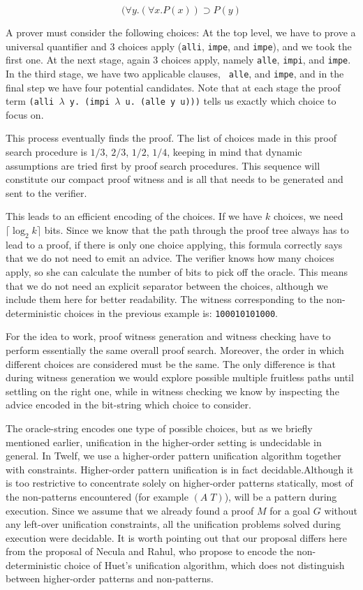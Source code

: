 \documentclass{acmconf}
\newcommand{\impl}{\supset}
\begin{document}
\[
(\forall y. (\forall x.P(x)) \impl P(y)
\]

A prover must consider the following choices: At the top level, we
have to prove a universal quantifier and 3 choices apply ({\tt alli},
{\tt impe}, and {\tt impe}), and we took the first one. At the next
stage, again 3 choices apply, namely {\tt alle}, {\tt   impi}, and
{\tt impe}. In the third stage, we have two applicable clauses, {\tt
  alle}, and {\tt impe}, and in the final step we have four potential
candidates. Note that at each stage the proof term {\tt (alli
  $\lambda$ y. (impi $\lambda$ u. (alle y u)))} tells us exactly which
choice to focus on.

This process eventually finds the proof. The list of
choices made in this proof search procedure is $1/3$, $2/3$, $1/2$,
$1/4$, keeping in mind that dynamic assumptions are tried first by
proof search procedures. This sequence will constitute our compact
proof witness and is all that needs to be generated and sent to the
verifier.  

This leads to an efficient encoding of the choices. If we have $k$
choices, we need $\lceil\log_2 k\rceil$ bits. Since we know that the
path through the proof tree always has to lead to a proof, if there is
only one choice applying, this formula correctly says that we do not
need to emit an advice.  The verifier knows how many choices apply, so
she can calculate the number of bits to pick off the oracle. This
means that we do not need an explicit separator between the choices,
although we include them here for better readability.
The witness corresponding to the non-deterministic choices in the
previous example is: {\tt 100010101000}.

For the idea to work, proof witness generation and witness checking
have to perform essentially the same overall proof search. Moreover,
the order in which different choices are considered must be the same.
The only difference is that during witness generation we would explore
possible multiple fruitless paths until settling on the right one,
while in witness checking we know by inspecting the advice encoded in
the bit-string which choice to consider.

The oracle-string encodes one type of possible choices, but as we
briefly mentioned earlier, unification in the higher-order setting is
undecidable in general. In Twelf, we use a higher-order pattern
unification algorithm together with constraints. Higher-order pattern
unification is in fact decidable.Although it is too restrictive to
concentrate solely on higher-order patterns statically, 
most of the non-patterns encountered (for example $(A\;T)$), will be a
pattern during execution. Since we assume that we already found a proof $M$
for a goal $G$ without any left-over unification constraints, 
all the unification problems solved during execution were
decidable. It is worth pointing out that our proposal differs here
from the proposal of Necula and Rahul, who propose to encode the
non-deterministic choice of Huet's unification algorithm, which does
not distinguish between higher-order patterns and non-patterns. 
\end{document}
